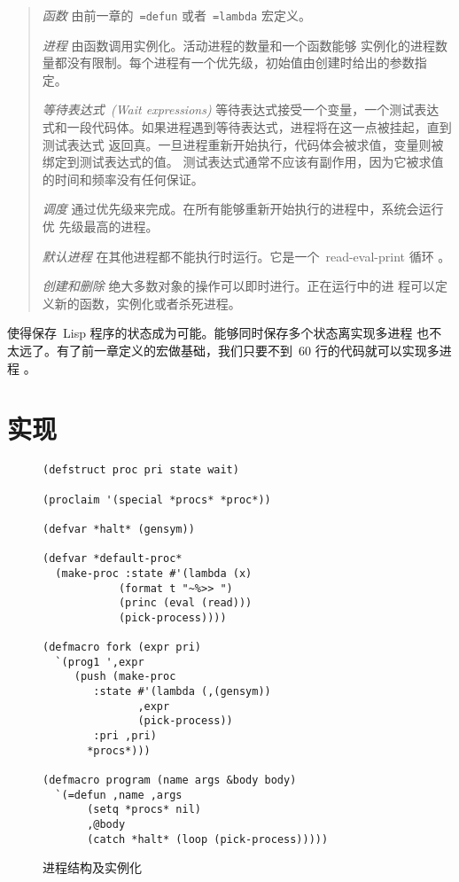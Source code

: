 \begin{quote}
    \emph{函数} 由前一章的~\texttt{=defun} 或者~\texttt{=lambda} 宏定义。

    \emph{进程} 由函数调用实例化。活动进程的数量和一个函数能够
    实例化的进程数量都没有限制。每个进程有一个优先级，初始值由创建时给出的参数指
    定。

    \emph{等待表达式~(Wait expressions)} 等待表达式接受一个变量，一个测试表达
    式和一段代码体。如果进程遇到等待表达式，进程将在这一点被挂起，直到测试表达式
    返回真。一旦进程重新开始执行，代码体会被求值，变量则被绑定到测试表达式的值。
    测试表达式通常不应该有副作用，因为它被求值的时间和频率没有任何保证。

    \emph{调度} 通过优先级来完成。在所有能够重新开始执行的进程中，系统会运行优
    先级最高的进程。

    \emph{默认进程} 在其他进程都不能执行时运行。它是一个~read-eval-print 循环
    。
    
    \emph{创建和删除} 绝大多数对象的操作可以即时进行。正在运行中的进
    程可以定义新的函数，实例化或者杀死进程。
\end{quote}

\continuation{}使得保存~Lisp 程序的状态成为可能。能够同时保存多个状态离实现多进程
也不太远了。有了前一章定义的宏做基础，我们只要不到~60 行的代码就可以实现多进程
。

\section{实现}

\begin{figure}
\begin{lstlisting}
(defstruct proc pri state wait)

(proclaim '(special *procs* *proc*))

(defvar *halt* (gensym))

(defvar *default-proc*
  (make-proc :state #'(lambda (x)
			(format t "~%>> ")
			(princ (eval (read)))
			(pick-process))))

(defmacro fork (expr pri)
  `(prog1 ',expr
     (push (make-proc
	    :state #'(lambda (,(gensym))
		       ,expr
		       (pick-process))
	    :pri ,pri)
	   *procs*)))

(defmacro program (name args &body body)
  `(=defun ,name ,args
	   (setq *procs* nil)
	   ,@body
	   (catch *halt* (loop (pick-process)))))
\end{lstlisting}
    \caption{进程结构及实例化}
    \label{fig:process_structure_and_instantiation}
\end{figure}

